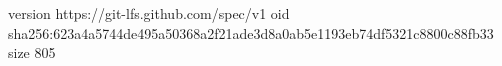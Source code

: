 version https://git-lfs.github.com/spec/v1
oid sha256:623a4a5744de495a50368a2f21ade3d8a0ab5e1193eb74df5321c8800c88fb33
size 805
